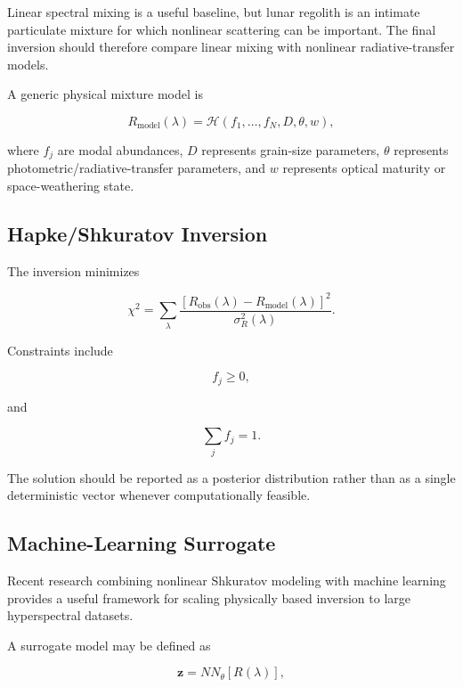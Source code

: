 \documentclass[11pt,a4paper]{article}
\begin{document}
Linear spectral mixing is a useful baseline, but lunar regolith is an intimate particulate mixture for which nonlinear scattering can be important. The final inversion should therefore compare linear mixing with nonlinear radiative-transfer models.

A generic physical mixture model is

\begin{equation}
R_{\mathrm{model}}(\lambda)
=
\mathcal{H}
\left(
f_1,\ldots,f_N,
D,
\theta,
w
\right),
\end{equation}

where $f_j$ are modal abundances, $D$ represents grain-size parameters, $\theta$ represents photometric/radiative-transfer parameters, and $w$ represents optical maturity or space-weathering state.

\subsection{Hapke/Shkuratov Inversion}

The inversion minimizes

\begin{equation}
\chi^2
=
\sum_{\lambda}
\frac{
\left[
R_{\mathrm{obs}}(\lambda)
-
R_{\mathrm{model}}(\lambda)
\right]^2
}{
\sigma_R^2(\lambda)
}.
\end{equation}

Constraints include

\begin{equation}
f_j\geq0,
\end{equation}

and

\begin{equation}
\sum_j f_j=1.
\end{equation}

The solution should be reported as a posterior distribution rather than as a single deterministic vector whenever computationally feasible.

\subsection{Machine-Learning Surrogate}

Recent research combining nonlinear Shkuratov modeling with machine learning provides a useful framework for scaling physically based inversion to large hyperspectral datasets.

A surrogate model may be defined as

\begin{equation}
\mathbf{z}
=
NN_\theta
\left[
R(\lambda)
\right],
\end{equation}
\end{document}
